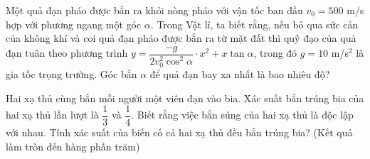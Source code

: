 \begin{bt}%

Một quả đạn pháo được bắn ra khỏi nòng pháo với vận tốc ban đầu $ v_0=500$ m/s hợp với phương ngang một góc $ \alpha $. Trong Vật lí, ta biết rằng, nếu bỏ qua sức cản của không khí và coi quả đạn pháo được bắn ra từ mặt đất thì quỹ đạo của quả đạn tuân theo phương trình $ y=\dfrac{-g}{2v_0^2\cos^2\alpha}\cdot x^2+x\tan \alpha $, trong đó $g = 10$ m/s$ ^2 $ là gia tốc trọng trường. Góc bắn $ \alpha $ để quả đạn bay xa nhất là bao nhiêu độ?
\end{bt}

\begin{bt}%

	Hai xạ thủ cùng bắn mỗi người một viên đạn vào bia. Xác suất bắn trúng bia của hai xạ thủ lần lượt là $\dfrac{1}{3}$ và $\dfrac{1}{4}$. Biết rằng việc bắn súng của hai xạ thủ là độc lập với nhau.	Tính xác suất của biến cố cả hai xạ thủ đều bắn trúng bia? (Kết quả làm tròn đến hàng phần trăm)
\end{bt}

